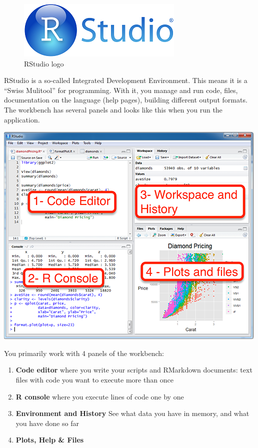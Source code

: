 \documentclass[]{book}
\providecommand{\tightlist}{%
  \setlength{\itemsep}{0pt}\setlength{\parskip}{0pt}}
\begin{document}
\begin{figure}
\centering
\includegraphics{figures/RStudioLogo.png}
\caption{RStudio logo}
\end{figure}

RStudio is a so-called Integrated Development Environment. This means it is a ``Swiss Mulitool'' for programming. With it, you manage and run code, files, documentation on the language (help pages), building different output formats.
The workbench has several panels and looks like this when you run the application.

\includegraphics{figures/RStudio_screen3.png}

You primarily work with 4 panels of the workbench:

\begin{enumerate}
\def\labelenumi{\arabic{enumi}.}
\tightlist
\item
  \textbf{Code editor} where you write your scripts and RMarkdown documents: text files with code you want to execute more than once
\item
  \textbf{R console} where you execute lines of code one by one
\item
  \textbf{Environment and History} See what data you have in memory, and what you have done so far
\item
  \textbf{Plots, Help \& Files}
\end{enumerate}
\end{document}
